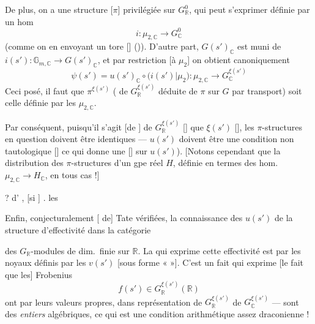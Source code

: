 \documentclass[11pt,a4paper]{article}
\begin{document}
De plus, on a une structure [$\pi$] privilégiée sur $G^{0}_{\mathbb{R}}$,
qui peut  s'exprimer définie par un hom
\struck{\ill{}}
\[
  i : \mu_{2,\mathbb{C}} \longrightarrow G^{0}_{\mathbb{C}}
\]
(comme on \ill{} en envoyant un tore [\ill{}] (\ill{})). D'autre part,
$G(s')_{\mathbb{C}}$ est muni de $i(s') : \mathbb{G}_{m,\mathbb{C}} \to
G(s')_{\mathbb{C}}$, et par restriction [à $\mu_2$] on obtient
canoniquement
\[
  \psi(s') = u(s')_{\mathbb{C}} \circ \bigl(i(s') \vert \mu_2\bigr) :
  \mu_{2,\mathbb{C}} \longrightarrow G_{\mathbb{C}}^{\xi(s')}
\]
 Ceci posé, il faut que $\pi^{\xi(s')}$ (\ill{} de
$G_{\mathbb{R}}^{\xi(s')}$ déduite de $\pi$ sur $G$ par transport) soit
celle définie par les $\mu_{2,\mathbb{C}}$.

Par conséquent, puisqu'il s'agit [de \ill{}] de $G_{\mathbb{R}}^{\xi(s')}$
[\ill{}] que $\xi(s')$ \ill{} [], les
$\pi$-structures en question doivent être identiques --- \ill{} $u(s')$
doivent être une condition non tautologique [\ill{}] ce qui donne une
[] sur $u(s')$). [Notons cependant que la
distribution des $\pi$-structures d'un gpe réel $H$, définie en termes des
hom.\ $\mu_{2,\mathbb{C}} \to H_{\mathbb{C}}$, \ill{} \ill{}
 en tous cas !]

? d' \ill{} , [si \ill{}] \ill{}
\ill{} \ill{} . \ill{} les 
\ill{} \ill{}

Enfin, conjecturalement \ill{} [ de]
Tate vérifiées, la connaissance des $u(s')$ \struck{\ill{}} \ill{} de la
structure d'effectivité dans la catégorie

des $G_{\mathbb{R}}$-modules de dim.\ finie sur $\mathbb{R}$. La
 qui exprime cette effectivité est 
par les  noyaux définis par les $v(s')$ [sous forme
«  »]. C'est un fait qui exprime [le fait que les]
Frobenius
\[
  f(s') \in G_{\mathbb{R}}^{\xi(s')}(\mathbb{R})
\]
ont \ill{} par leurs valeurs propres, dans \ill{} représentation \ill{} de
$G_{\mathbb{R}}^{\xi(s')}$  \ill{} \ill{} de
$G_{\mathbb{C}}^{\xi(s')}$ --- sont des \emph{entiers} algébriques, ce qui
est une condition arithmétique assez draconienne !
\end{document}

